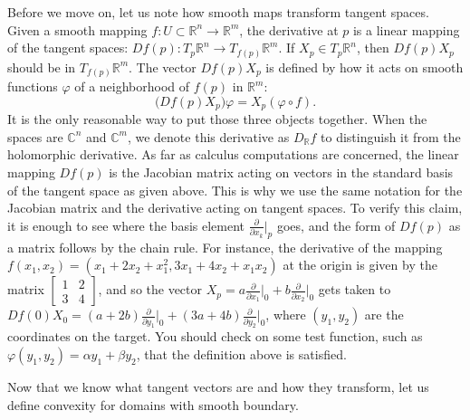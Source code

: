 \documentclass[12pt,openany]{book}
\newcommand{\C}{{\mathbb{C}}}
\newcommand{\R}{{\mathbb{R}}}
\theoremstyle{plain}
\theoremstyle{remark}
\theoremstyle{definition}
\theoremstyle{exercise}
\theoremstyle{example}
\begin{document}
Before we move on, let us note how smooth maps transform tangent spaces.
Given a smooth mapping
$f \colon U \subset \R^n \to \R^m$,
the derivative at $p$ is a linear mapping of
the tangent spaces: $Df(p) \colon T_p \R^n \to T_{f(p)} \R^m$.
If $X_p \in T_p \R^n$, then
$Df(p) X_p$ should be in $T_{f(p)} \R^m$.
The vector
$Df(p) X_p$ is defined by how it acts on
smooth functions $\varphi$ of a neighborhood
of $f(p)$ in $\R^m$:
%
\begin{equation*}
\bigl( Df(p) X_p \bigr) \varphi = X_p (\varphi \circ f) .
\end{equation*}
It is the only reasonable way to put those three objects together.
When the spaces are $\C^n$ and $\C^m$, we denote this
derivative as
%
$D_\R f$
to distinguish it from the holomorphic derivative.
As far as calculus computations are concerned,
the linear mapping $Df(p)$ is
the Jacobian matrix acting on vectors in the standard basis of the tangent space
as given above.
This is why we use the same notation for the Jacobian
matrix and the derivative acting on tangent spaces.
To verify this claim, it is enough to see where the basis element
$\frac{\partial}{\partial x_k}\big|_p$ goes, and the form of $Df(p)$
as a matrix
follows by the chain rule.
For instance, the derivative of the mapping $f(x_1,x_2) =
(x_1+2x_2+x_1^2,3x_1+4x_2+x_1x_2)$ at the origin is given by the matrix
$\left[ \begin{smallmatrix} 1 & 2 \\ 3 & 4 \end{smallmatrix} \right]$,
and so the vector
$X_p = a\frac{\partial}{\partial x_1}\big|_0
+
b\frac{\partial}{\partial x_2}\big|_0$
gets taken to
$Df(0) X_0 = (a+2b)\frac{\partial}{\partial y_1}\big|_0
+
(3a+4b)\frac{\partial}{\partial y_2}\big|_0$, where $(y_1,y_2)$ are the
coordinates on the target.  You should check on some test
function, such as
$\varphi(y_1,y_2) = \alpha y_1 + \beta y_2$, that the definition above is
satisfied.

\medskip

Now that we know what tangent vectors are and how they transform,
let us define convexity
for domains with smooth boundary.
\end{document}

